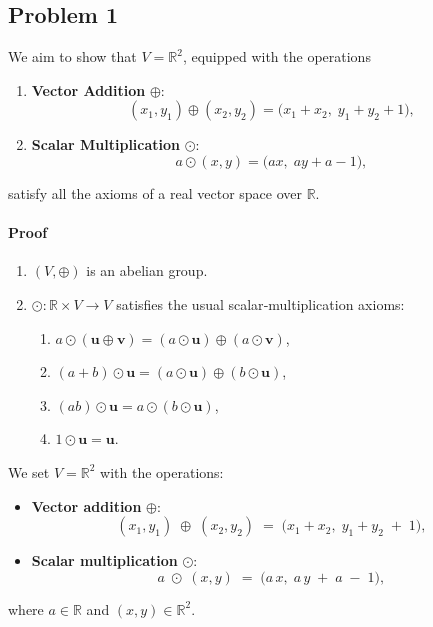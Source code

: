 \documentclass[12pt]{article}
\begin{document}
\newpage

\subsection*{Problem 1}
\cite{proofwiki}
We aim to show that \( V = \mathbb{R}^2 \), equipped with the operations

\begin{enumerate}
    \item \textbf{Vector Addition} \(\oplus\):
    \[
    (x_1, y_1) \oplus (x_2, y_2) = \bigl(x_1 + x_2,\; y_1 + y_2 + 1\bigr),
    \]
    \item \textbf{Scalar Multiplication} \(\odot\):
    \[
    a \odot (x, y) = \bigl(a x,\; a y + a - 1\bigr),
    \]
\end{enumerate}

satisfy all the axioms of a real vector space over \(\mathbb{R}\).

\paragraph{Proof}

\begin{enumerate}
    \item \((V, \oplus)\) is an abelian group.
    \item \(\odot : \mathbb{R} \times V \to V\) satisfies the usual scalar‐multiplication axioms:
    \begin{enumerate}
        \item \(a \odot (\mathbf{u} \oplus \mathbf{v}) = (a \odot \mathbf{u}) \oplus (a \odot \mathbf{v})\),
        \item \((a + b) \odot \mathbf{u} = (a \odot \mathbf{u}) \oplus (b \odot \mathbf{u})\),
        \item \((ab) \odot \mathbf{u} = a \odot (b \odot \mathbf{u})\),
        \item \(1 \odot \mathbf{u} = \mathbf{u}\).
    \end{enumerate}
\end{enumerate}

We set \(V = \mathbb{R}^2\) with the operations:

\begin{itemize}
    \item \textbf{Vector addition} \(\oplus\):
    \[
    (x_1, y_1) \;\oplus\; (x_2, y_2) \;=\;\bigl(x_1 + x_2,\; y_1 + y_2 \;+\; 1\bigr),
    \]
    \item \textbf{Scalar multiplication} \(\odot\):
    \[
    a \;\odot\; (x,y) \;=\;\bigl(a\,x,\; a\,y \;+\; a \;-\; 1\bigr),
    \]
\end{itemize}
where \(a\in \mathbb{R}\) and \((x,y) \in \mathbb{R}^2\).
\end{document}
